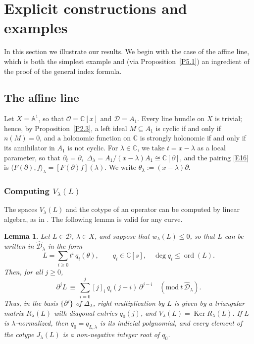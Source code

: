 \documentclass[11pt,reqno]{amsart}
\theoremstyle{plain}
\newtheorem{lemma}{Lemma}[section]
\theoremstyle{definition}
\theoremstyle{remark}
\numberwithin{equation}{section}
\newcommand{\cD}{\mathcal{D}}
\newcommand{\cO}{\mathcal{O}}
\newcommand{\C}{\mathbb{C}}
\newcommand{\A}{\mathbb{A}}
\newcommand{\del}{\partial}
\newcommand{\hD}{\widehat{\cD}}
\newcommand{\Dl}{\Delta_\lambda}
\newcommand{\ff}[2]{[#1]_{#2}}          %
\newcommand{\lan}{\langle}
\newcommand{\ran}{\rangle}
\DeclareMathOperator{\Ker}{Ker}
\DeclareMathOperator{\ord}{ord}
\begin{document}
\section{Explicit constructions and examples}
\label{S6}

In this section we illustrate our results. We begin with the case of the affine line, which is
both the simplest example and (via Proposition~\ref{P5.1}) an ingredient of the proof of the
general index formula.

\subsection{The affine line}
\label{S6.1}
Let $X = \A^1$, so that $\cO = \C[x]$ and $\cD = A_1$. Every line bundle on $X$ is trivial; hence,
by Proposition~\ref{P2.3}, a left ideal $M \subseteq A_1$ is cyclic if and only if $n(M) = 0$, and
a holonomic function on $\C$ is strongly holonomic if and only if its annihilator in $A_1$ is not
cyclic. For $\lambda \in \C$, we take $t = x - \lambda$ as a local parameter, so that $\del_t =
\del$, $\,\Dl = A_1/(x-\lambda) A_1 \cong \C[\del]$, and the pairing \eqref{E16} is
$\lan F(\del), f \ran_\lambda = [F(\del) f](\lambda)$. We write $\theta_\lambda := (x - \lambda)
\del$.

\subsubsection{Computing $V_\lambda(L)$}
The spaces $V_\lambda(L)$ and the cotype of an operator can be computed by linear algebra, as in
\cite{Tsai}. The following lemma is valid for any curve.

\begin{lemma}
\label{L6.1}
Let $L \in \cD$, $\lambda \in X$, and suppose that $w_\lambda(L) \le 0$, so that $L$ can be
written in $\hD_\lambda$ in the form
\begin{equation}
\label{E61}
  L = \sum_{i \ge 0} t^i\, q_i(\theta) , \qquad q_i \in \C[s] , \quad \deg q_i \le \ord(L) .
\end{equation}
Then, for all $j \ge 0$,
\begin{equation}
\label{E62}
  \del^j L \, \equiv \, \sum_{i=0}^{j} \ff{j}{i}\, q_i(j - i)\, \del^{j-i} \quad (\mathrm{mod}\ t\,
  \hD_\lambda) .
\end{equation}
Thus, in the basis $\{\del^j\}$ of $\Dl$, right multiplication by $L$ is given by a triangular
matrix $R_\lambda(L)$ with diagonal entries $q_0(j)$, and $V_\lambda(L) = \Ker R_\lambda(L)$. If
$L$ is $\lambda$-normalized, then $q_0 = q_{L,\lambda}$ is its indicial polynomial, and every
element of the cotype $J_\lambda(L)$ is a non-negative integer root of $q_0$.
\end{lemma}
\end{document}
